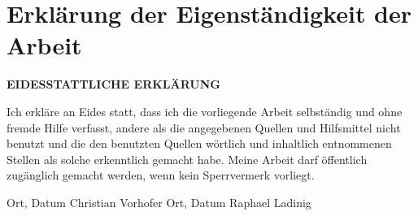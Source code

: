 \chapter*{Erklärung der Eigenständigkeit der Arbeit}
\label{cha:affirmation}


\textbf{EIDESSTATTLICHE ERKLÄRUNG }
\vspace{1cm}

Ich erkläre an Eides statt, dass ich die vorliegende Arbeit selbständig und ohne fremde Hilfe verfasst, andere als die angegebenen Quellen und Hilfsmittel nicht benutzt und die den benutzten Quellen wörtlich und inhaltlich entnommenen Stellen als solche erkenntlich gemacht habe. Meine Arbeit darf öffentlich zugänglich gemacht werden, wenn kein Sperrvermerk vorliegt.

\vfill\vfill



Ort, Datum  \hspace{5cm}Christian Vorhofer
\vfill
Ort, Datum  \hspace{5cm}Raphael Ladinig
